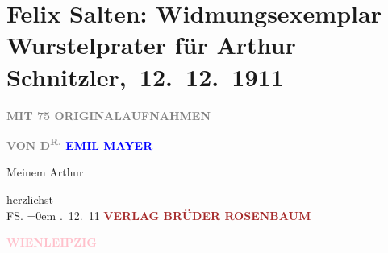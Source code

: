 

\renewcommand{\erwaehntePersonen}{Personen: Emil Mayer, Felix Salten}
\renewcommand{\erwaehnteInstitutionen}{Institutionen: Verlagsanstalt Brüder Rosenbaum}
\renewcommand{\erwaehnteOrte}{Orte: Leipzig, Wien}
\renewcommand{\erwaehnteWerke}{Werke: Wurstelprater}
\section[ Felix Salten: Widmungsexemplar Wurstelprater für Arthur Schnitzler, 12. 12. 1911]{Felix Salten: Widmungsexemplar Wurstelprater für Arthur
               Schnitzler, 12. 12. 1911}
\nopagebreak{}
\rehead{ }\normalsize\beginnumbering{}
\toendnotes[C]{\smallbreak\pagebreak[2]}
\toendnotes[C]{\smallbreak}
\pstart
           \noindent{}\centering{}{\pb}\textcolor{gray}{\textbf{\textbf{\textcolor{green}{}{}\ledrightnote{\textcolor{green}{Wurstelprater}}}}}\pend
           
\pstart
           \noindent{}\centering{}\textcolor{gray}{\textbf{}}\pend
           
\pstart
           \noindent{}\centering{}\textcolor{gray}{\textbf{MIT 75 ORIGINALAUFNAHMEN}}\pend
           
\pstart
           \noindent{}\centering{}\textcolor{gray}{\textbf{VON D\textsuperscript{R.}{ }\textcolor{blue}{EMIL MAYER}{}\ledrightnote{\textcolor{blue}{Emil Mayer}}}}\pend
           
\pstart
           \noindent{}Meinem \label{K_L03052-1v}\label{K_L03052-1h} Arthur\pend
           
\pstart
           herzlichst{\\[\baselineskip]}\spacefill\mbox{FS.}\pend
           \leftskip=0em{}
. 12. 11\pend
           {\bigskip}
\pstart
           \noindent{}\centering{}\textcolor{gray}{\textbf{\textcolor{brown}{VERLAG BRÜDER ROSENBAUM}{}\ledrightnote{\textcolor{brown}{Verlagsanstalt Brüder Rosenbaum}}}}\pend
           
\pstart
           \noindent{}\textcolor{gray}{\textbf{\textcolor{pink}{WIEN}{}\ledrightnote{\textcolor{pink}{Wien}}}}\hfill \textcolor{gray}{\textbf{\textcolor{pink}{LEIPZIG}{}\ledrightnote{\textcolor{pink}{Leipzig}}}}\pend
           \endnumbering{}  
      